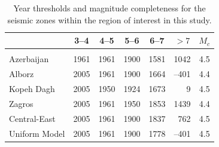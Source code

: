 \begin{table}%
    \centering
    \caption{Year thresholds and magnitude completeness for the seismic zones within the region of interest in this study.}
    \begin{tabular}{@{\hspace{0.2ex}}lccccrc@{\hspace{0.2ex}}}
        \cline{2-7}                                              \\[-1.6ex]
                        & 3--4 & 4--5 & 5--6 & 6--7 & 
                                  \multicolumn{1}{c}{$>7$} &$M_c$\\[0.6ex]
        \hline                                                   \\[-1.6ex]
        Azerbaijan      & 1961 & 1961 & 1900 & 1581 & 1042 & 4.5 \\
        Alborz          & 2005 & 1961 & 1900 & 1664 &--401 & 4.4 \\
        Kopeh Dagh      & 2005 & 1950 & 1924 & 1673 &    9 & 4.5 \\
        Zagros          & 2005 & 1961 & 1950 & 1853 & 1439 & 4.4 \\
        Central-East    & 2005 & 1961 & 1900 & 1837 &  762 & 4.5 \\
        Uniform Model   & 2005 & 1961 & 1900 & 1778 &--401 & 4.5 \\[0.5ex]
        \hline 
    \end{tabular}
    \label{tab:completeness} 
\end{table}





